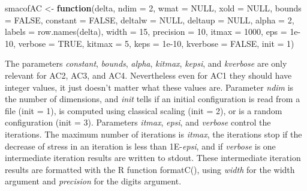 \documentclass[
  12pt,
  letterpaper,
  DIV=11,
  numbers=noendperiod]{scrartcl}
\newenvironment{Shaded}{\begin{snugshade}}{\end{snugshade}}
\newcommand{\AttributeTok}[1]{\textcolor[rgb]{0.40,0.45,0.13}{#1}}
\newcommand{\ConstantTok}[1]{\textcolor[rgb]{0.56,0.35,0.01}{#1}}
\newcommand{\ControlFlowTok}[1]{\textcolor[rgb]{0.00,0.23,0.31}{\textbf{#1}}}
\newcommand{\DecValTok}[1]{\textcolor[rgb]{0.68,0.00,0.00}{#1}}
\newcommand{\FloatTok}[1]{\textcolor[rgb]{0.68,0.00,0.00}{#1}}
\newcommand{\FunctionTok}[1]{\textcolor[rgb]{0.28,0.35,0.67}{#1}}
\newcommand{\NormalTok}[1]{\textcolor[rgb]{0.00,0.23,0.31}{#1}}
\newcommand{\OtherTok}[1]{\textcolor[rgb]{0.00,0.23,0.31}{#1}}
\begin{document}
\begin{Shaded}
\begin{Highlighting}[]
\NormalTok{smacofAC }\OtherTok{\textless{}{-}} \ControlFlowTok{function}\NormalTok{(delta,}
                     \AttributeTok{ndim =} \DecValTok{2}\NormalTok{,}
                     \AttributeTok{wmat =} \ConstantTok{NULL}\NormalTok{,}
                     \AttributeTok{xold =} \ConstantTok{NULL}\NormalTok{,}
                     \AttributeTok{bounds =} \ConstantTok{FALSE}\NormalTok{,}
                     \AttributeTok{constant =} \ConstantTok{FALSE}\NormalTok{,}
                     \AttributeTok{deltalw =} \ConstantTok{NULL}\NormalTok{,}
                     \AttributeTok{deltaup =} \ConstantTok{NULL}\NormalTok{,}
                     \AttributeTok{alpha =} \DecValTok{2}\NormalTok{,}
                     \AttributeTok{labels =} \FunctionTok{row.names}\NormalTok{(delta),}
                     \AttributeTok{width =} \DecValTok{15}\NormalTok{,}
                     \AttributeTok{precision =} \DecValTok{10}\NormalTok{,}
                     \AttributeTok{itmax =} \DecValTok{1000}\NormalTok{,}
                     \AttributeTok{eps =} \FloatTok{1e{-}10}\NormalTok{,}
                     \AttributeTok{verbose =} \ConstantTok{TRUE}\NormalTok{,}
                     \AttributeTok{kitmax =} \DecValTok{5}\NormalTok{,}
                     \AttributeTok{keps =} \FloatTok{1e{-}10}\NormalTok{,}
                     \AttributeTok{kverbose =} \ConstantTok{FALSE}\NormalTok{,}
                     \AttributeTok{init =} \DecValTok{1}\NormalTok{)}
\end{Highlighting}
\end{Shaded}

The parameters \emph{constant}, \emph{bounds}, \emph{alpha},
\emph{kitmax}, \emph{kepsi}, and \emph{kverbose} are only relevant for
AC2, AC3, and AC4. Nevertheless even for AC1 they should have integer
values, it just doesn't matter what these values are. Parameter
\emph{ndim} is the number of dimensions, and \emph{init} tells if an
initial configuration is read from a file (init = 1), is computed using
classical scaling (init = 2), or is a random configuration (init = 3).
Parameters \emph{itmax}, \emph{epsi}, and \emph{verbose} control the
iterations. The maximum number of iterations is \emph{itmax}, the
iterations stop if the decrease of stress in an iteration is less than
1E-\emph{epsi}, and if \emph{verbose} is one intermediate iteration
results are written to stdout. These intermediate iteration results are
formatted with the R function formatC(), using \emph{width} for the
width argument and \emph{precision} for the digits argument.
\end{document}
